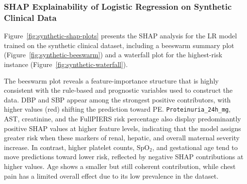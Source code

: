 \documentclass[diagnostics,article,submit,pdftex,moreauthors]{Definitions/mdpi}
\begin{document}
\subsubsection{SHAP Explainability of Logistic Regression on Synthetic Clinical Data}
\label{sec:lr-synthetic-xai}

Figure~\ref{fig:synthetic-shap-plots} presents the \ac{SHAP} analysis
for the \ac{LR} model trained on the synthetic clinical dataset,
including a beeswarm summary plot
(Figure~\ref{fig:synthetic-beeswarm}) and a waterfall plot for the
highest-risk instance (Figure~\ref{fig:synthetic-waterfall}).

The beeswarm plot reveals a feature-importance structure that is
highly consistent with the rule-based and prognostic variables used to
construct the data. \ac{DBP} and \ac{SBP} appear among the strongest
positive contributors, with higher values (red) shifting the
prediction toward \ac{PE}. \texttt{Proteinuria\_24h\_mg},
\ac{AST}, creatinine, and the FullPIERS risk percentage also display
predominantly positive \ac{SHAP} values at higher feature levels,
indicating that the model assigns greater risk when these markers of
renal, hepatic, and overall maternal severity increase. In contrast,
higher platelet counts, $\mathrm{SpO_2}$, and gestational age tend to
move predictions toward lower risk, reflected by negative \ac{SHAP}
contributions at higher values. Age shows a smaller but still coherent
contribution, while chest pain has a limited overall effect due to its
low prevalence in the dataset.
\end{document}
